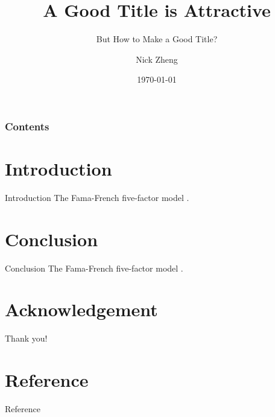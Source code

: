 \documentclass[10pt]{beamer}
\title[The University of Hong Kong]{A Good Title is Attractive}
\subtitle{But How to Make a Good Title?}
\author[Nick Zheng]{Nick Zheng}
\institute[somebody@gmail.com]{ The University of Hong Kong

Business School}
\date[\today]{\today}
\begin{document}
\frame{\titlepage}
\begin{frame}
\frametitle{Contents}
\tableofcontents
\end{frame}
\section{Introduction}
\begin{frame}{Introduction}
    The Fama-French five-factor model \citep{fama_five-factor_2015}.
\end{frame}

\section{Conclusion}
\begin{frame}{Conclusion}
    The Fama-French five-factor model \citep{fama_five-factor_2015}.
\end{frame}

\section*{Acknowledgement}  
\begin{frame}
\textcolor{myNewColorC}{\Huge{\centerline{Thank you!}}}
\end{frame}

\section*{Reference}  
\begin{frame}{Reference}
\scriptsize


\end{frame}
\end{document}
